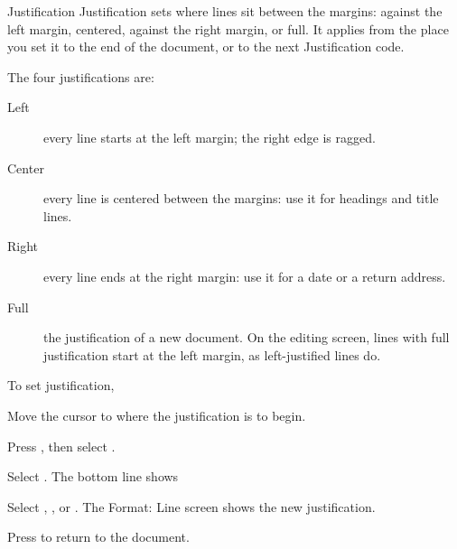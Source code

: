 \begin{Feature}{Justification}
Justification sets where lines sit between the margins: against the left
margin, centered, against the right margin, or full.  It applies from the
place you set it to the end of the document, or to the next Justification
code.

The four justifications are:
\begin{description}
\item[Left] every line starts at the left margin; the right edge is ragged.
\item[Center] every line is centered between the margins: use it for
headings and title lines.
\item[Right] every line ends at the right margin: use it for a date or a
return address.
\item[Full] the justification of a new document.  On the editing screen,
lines with full justification start at the left margin, as left-justified
lines do.
\end{description}

To set justification,
\begin{WPSteps}
\item Move the cursor to where the justification is to begin.
\item Press , then select .
\item Select .  The bottom line shows
\item Select , ,  or .
The Format: Line screen shows the new justification.
\item Press  to return to the document.
\end{WPSteps}


\end{Feature}
